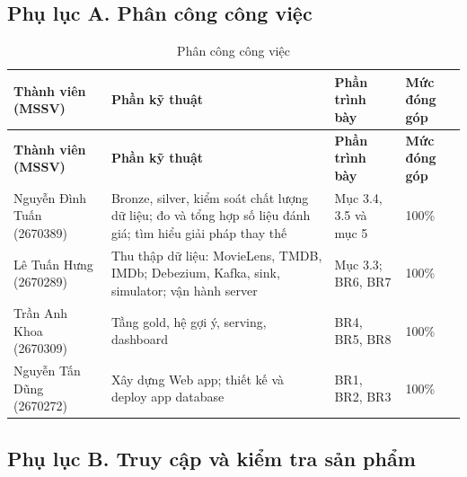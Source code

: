 \documentclass[a4paper,11pt]{article}
\newlength{\reporttablewidth}
\begin{document}
\subsection*{Phụ lục A. Phân công công việc}

\begingroup
\small
{}
\setlength{\tabcolsep}{4pt}
\renewcommand{\arraystretch}{1.18}
\setlength{\reporttablewidth}{\dimexpr\linewidth-6\tabcolsep\relax}
\begin{longtable}{@{}L{0.23\reporttablewidth} L{0.43\reporttablewidth} L{0.20\reporttablewidth} L{0.14\reporttablewidth}@{}}
\caption[Phân công công việc (Phụ lục A)]{Phân công công việc}\label{tab:23} \\
\toprule
\textbf{Thành viên (MSSV)} & \textbf{Phần kỹ thuật} & \textbf{Phần trình bày} & \textbf{Mức đóng góp} \\
\midrule
\endfirsthead
\toprule
\textbf{Thành viên (MSSV)} & \textbf{Phần kỹ thuật} & \textbf{Phần trình bày} & \textbf{Mức đóng góp} \\
\midrule
\endhead
\midrule
\endfoot
\bottomrule
\endlastfoot
Nguyễn Đình Tuấn (2670389) & Bronze, silver, kiểm soát chất lượng dữ liệu; đo và tổng hợp số liệu đánh giá; tìm hiểu giải pháp thay thế & Mục 3.4, 3.5 và mục 5 & 100\% \\
Lê Tuấn Hưng (2670289) & Thu thập dữ liệu: MovieLens, TMDB, IMDb; Debezium, Kafka, sink, simulator; vận hành server & Mục 3.3; BR6, BR7 & 100\% \\
Trần Anh Khoa (2670309) & Tầng gold, hệ gợi ý, serving, dashboard & BR4, BR5, BR8 & 100\% \\
Nguyễn Tấn Dũng (2670272) & Xây dựng Web app;  thiết kế và deploy app database & BR1, BR2, BR3 & 100\% \\
\end{longtable}
\endgroup

\subsection*{Phụ lục B. Truy cập và kiểm tra sản phẩm}
\end{document}
